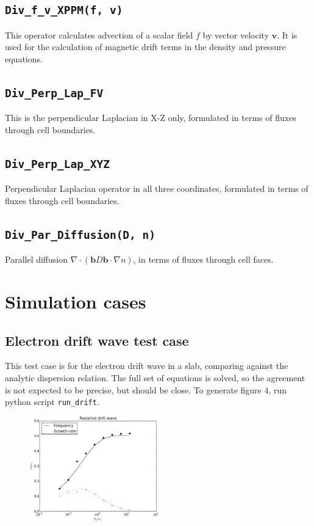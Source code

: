 \documentclass[12pt,a4paper]{article}
\begin{document}
\subsection{\texttt{Div\_f\_v\_XPPM(f, v)}}

This operator calculates advection of a scalar field $f$ by vector velocity
$\mathbf{v}$. It is used for the calculation of magnetic drift terms in the density and pressure equations.

\subsection{\texttt{Div\_Perp\_Lap\_FV}}

This is the perpendicular Laplacian in X-Z only, formulated in terms
of fluxes through cell boundaries.

\subsection{\texttt{Div\_Perp\_Lap\_XYZ}}

Perpendicular Laplacian operator in all three coordinates, formulated
in terms of fluxes through cell boundaries.

\subsection{\texttt{Div\_Par\_Diffusion(D, n)}}

Parallel diffusion $\nabla\cdot\left(\mathbf{b}D \mathbf{b}\cdot\nabla n\right)$, in terms of fluxes through cell faces.

\section{Simulation cases}

\subsection{Electron drift wave test case}

This test case is for the electron drift wave in a slab, comparing against
the analytic dispersion relation. The full set of equations is solved,
so the agreement is not expected to be precise, but should be close. 
To generate figure 4, run python script \texttt{run\_drift}.
\begin{figure}
\centering
\includegraphics[width=0.5\textwidth]{figs/driftwave.pdf}
\end{figure}
\end{document}
